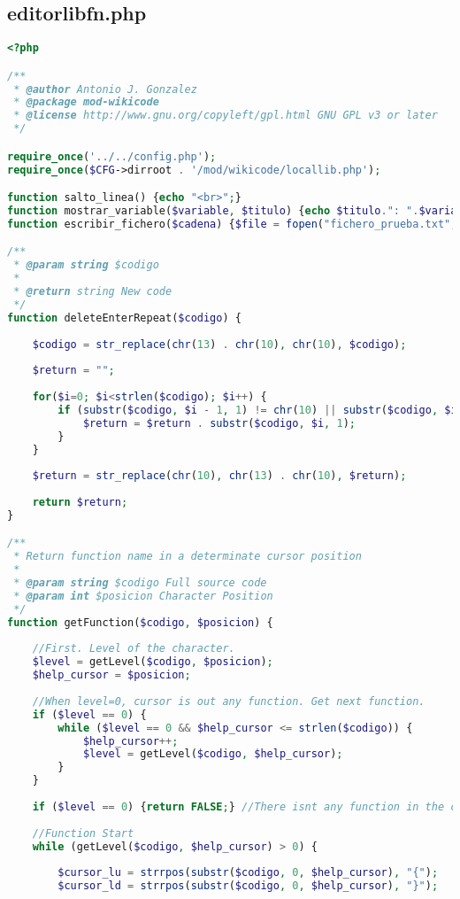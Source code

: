 \subsection{editorlibfn.php}
\begin{lstlisting}[language=PHP]
<?php

/**
 * @author Antonio J. Gonzalez
 * @package mod-wikicode
 * @license http://www.gnu.org/copyleft/gpl.html GNU GPL v3 or later
 */

require_once('../../config.php');
require_once($CFG->dirroot . '/mod/wikicode/locallib.php');

function salto_linea() {echo "<br>";}
function mostrar_variable($variable, $titulo) {echo $titulo.": ".$variable; salto_linea(); }
function escribir_fichero($cadena) {$file = fopen("fichero_prueba.txt","a"); fputs($file, $cadena); fclose($file); }

/**
 * @param string $codigo
 * 
 * @return string New code
 */
function deleteEnterRepeat($codigo) {
	
	$codigo = str_replace(chr(13) . chr(10), chr(10), $codigo);
	
	$return = "";
	
	for($i=0; $i<strlen($codigo); $i++) {
		if (substr($codigo, $i - 1, 1) != chr(10) || substr($codigo, $i, 1) != chr(10) || substr($codigo, $i+1, 1) != chr(10) || substr($codigo, $i+2, 1) != chr(10)) {
			$return = $return . substr($codigo, $i, 1);
		}
	}
	
	$return = str_replace(chr(10), chr(13) . chr(10), $return);
	
	return $return;
}

/**
 * Return function name in a determinate cursor position
 *
 * @param string $codigo Full source code
 * @param int $posicion Character Position
 */
function getFunction($codigo, $posicion) {
		
	//First. Level of the character.
	$level = getLevel($codigo, $posicion);
	$help_cursor = $posicion;
	
	//When level=0, cursor is out any function. Get next function.
	if ($level == 0) {
		while ($level == 0 && $help_cursor <= strlen($codigo)) {
			$help_cursor++;
			$level = getLevel($codigo, $help_cursor);
		}	
	}
	
	if ($level == 0) {return FALSE;} //There isnt any function in the code
	
	//Function Start
	while (getLevel($codigo, $help_cursor) > 0) {
		
	    $cursor_lu = strrpos(substr($codigo, 0, $help_cursor), "{");
		$cursor_ld = strrpos(substr($codigo, 0, $help_cursor), "}");
		

\end{lstlisting}
